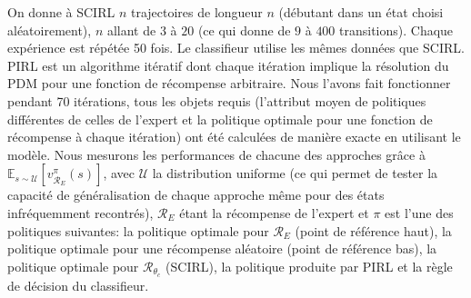 \documentclass[english,utf8]{./hermes-journal}
\newcommand{\R}{\mathcal{R}}
\newcommand{\E}{\mathbb{E}}
\begin{document}
On donne à SCIRL $n$ trajectoires de longueur $n$ (débutant dans un état choisi aléatoirement), $n$ allant de  $3$ à $20$ (ce qui donne de $9$ à
$400$ transitions). Chaque expérience est répétée 50 fois. Le classifieur utilise les mêmes données que SCIRL. PIRL est un algorithme itératif dont chaque itération implique la résolution du PDM pour une fonction de récompense arbitraire. Nous l'avons fait fonctionner pendant 70 itérations, tous les objets requis (l'attribut moyen de politiques différentes de celles de l'expert et la politique optimale pour une fonction de récompense à chaque itération) ont été calculées de manière exacte en utilisant le modèle. Nous mesurons les performances de chacune des approches grâce à $\E_{s\sim \mathcal{U}}[v^\pi_{\R_E}(s)]$, avec $\mathcal{U}$
la distribution uniforme (ce qui permet de tester la capacité de généralisation de chaque approche même pour des états infréquemment recontrés), $\R_E$ étant la récompense de l'expert et $\pi$ est l'une des politiques suivantes: la politique optimale pour $\R_E$ (point de référence haut),
la politique optimale pour une récompense aléatoire (point de référence bas), la politique optimale pour $\R_{\theta_c}$ (SCIRL), la politique produite par PIRL et la règle de décision du classifieur.
\end{document}
